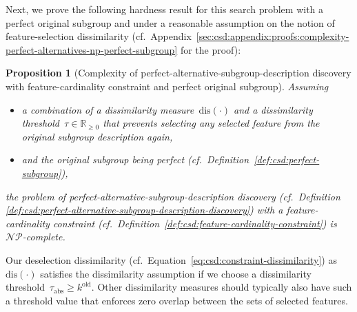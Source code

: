 \documentclass{article}
\newtheorem{proposition}{Proposition}
\theoremstyle{definition}
\begin{document}
%
Next, we prove the following hardness result for this search problem with a perfect original subgroup and under a reasonable assumption on the notion of feature-selection dissimilarity (cf.~Appendix~\ref{sec:csd:appendix:proofs:complexity-perfect-alternatives-np-perfect-subgroup} for the proof):
%
\begin{proposition}[Complexity of perfect-alternative-subgroup-description discovery with feature-cardinality constraint and perfect original subgroup]
	Assuming
	\begin{itemize}[noitemsep]
		\item a combination of a dissimilarity measure~$\text{dis}(\cdot)$ and a dissimilarity threshold~$\tau \in \mathbb{R}_{\geq 0}$ that prevents selecting any selected feature from the original subgroup description again,
		\item and the original subgroup being perfect (cf.~Definition~\ref{def:csd:perfect-subgroup}),
	\end{itemize}
	the problem of perfect-alternative-subgroup-description discovery (cf.~Definition \ref{def:csd:perfect-alternative-subgroup-description-discovery}) with a feature-cardinality constraint (cf.~Definition~\ref{def:csd:feature-cardinality-constraint}) is $\mathcal{NP}$-complete.
	\label{prop:csd:complexity-perfect-alternatives-np-perfect-subgroup}
\end{proposition}
%
Our deselection dissimilarity (cf.~Equation~\ref{eq:csd:constraint-dissimilarity}) as~$\text{dis}(\cdot)$ satisfies the dissimilarity assumption if we choose a dissimilarity threshold~$\tau_{\text{abs}} \geq k^{\text{old}}$.
Other dissimilarity measures should typically also have such a threshold value that enforces zero overlap between the sets of selected features.
\end{document}

